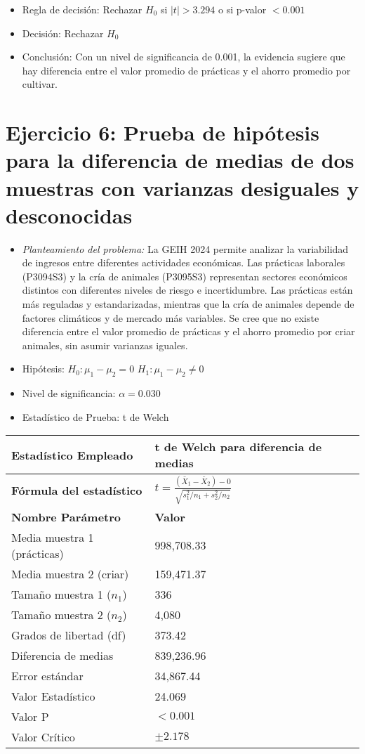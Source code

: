 \documentclass[12pt,a4paper]{article}
\begin{document}
\begin{itemize}
    \item Regla de decisión: Rechazar $H_0$ si $|t| > 3.294$ o si p-valor $< 0.001$
    \item Decisión: Rechazar $H_0$
    \item Conclusión: Con un nivel de significancia de 0.001, la evidencia sugiere que hay diferencia entre el valor promedio de prácticas y el ahorro promedio por cultivar.
\end{itemize}

\section*{Ejercicio 6: Prueba de hipótesis para la diferencia de medias de dos muestras con varianzas desiguales y desconocidas}
\begin{itemize}
    \item \textit{Planteamiento del problema:} La GEIH 2024 permite analizar la variabilidad de ingresos entre diferentes actividades económicas. Las prácticas laborales (P3094S3) y la cría de animales (P3095S3) representan sectores económicos distintos con diferentes niveles de riesgo e incertidumbre. Las prácticas están más reguladas y estandarizadas, mientras que la cría de animales depende de factores climáticos y de mercado más variables. Se cree que no existe diferencia entre el valor promedio de prácticas y el ahorro promedio por criar animales, sin asumir varianzas iguales.
    \item Hipótesis: \quad $H_{0}: \mu_1 - \mu_2 = 0$ \hspace{2cm} $H_{1}: \mu_1 - \mu_2 \neq 0$
    \item Nivel de significancia: $\alpha = 0.030$
    \item Estadístico de Prueba: t de Welch
\end{itemize}

\begin{tabular}{|m{7cm}|m{7cm}|}
\hline
\textbf{Estadístico Empleado} & t de Welch para diferencia de medias \\ \hline
\textbf{Fórmula del estadístico} & $t = \frac{(\bar{X}_1 - \bar{X}_2) - 0}{\sqrt{s_1^2/n_1 + s_2^2/n_2}}$ \\ \hline
\textbf{Nombre Parámetro} & \textbf{Valor} \\ \hline
Media muestra 1 (prácticas) & 998,708.33 \\ \hline
Media muestra 2 (criar) & 159,471.37 \\ \hline
Tamaño muestra 1 ($n_1$) & 336 \\ \hline
Tamaño muestra 2 ($n_2$) & 4,080 \\ \hline
Grados de libertad (df) & 373.42 \\ \hline
Diferencia de medias & 839,236.96 \\ \hline
Error estándar & 34,867.44 \\ \hline
Valor Estadístico & 24.069 \\ \hline
Valor P & $< 0.001$ \\ \hline
Valor Crítico & $\pm 2.178$ \\ \hline
\end{tabular}
\end{document}
